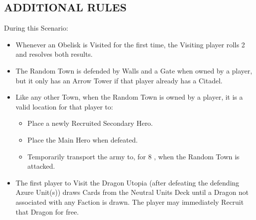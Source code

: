 \begin{multicols}{2}
\subsection*{\MakeUppercase{Additional Rules}}
During this Scenario:
\begin{itemize}
  \item Whenever an Obelisk is Visited for the first time, the Visiting player rolls 2  and resolves both results.
  \item The Random Town is defended by Walls and a Gate when owned by a player, but it only has an Arrow Tower if that player already has a Citadel.
  \item Like any other Town, when the Random Town is owned by a player, it is a valid location for that player to:
    \begin{itemize}
      \item Place a newly Recruited Secondary Hero.
      \item Place the Main Hero when defeated.
      \item Temporarily transport the army to, for 8 , when the Random Town is attacked.
    \end{itemize}
  \item The first player to Visit the Dragon Utopia (after defeating the defending Azure Unit(s)) draws Cards from the Neutral Units  Deck until a Dragon not associated with any Faction is drawn.
    The player may immediately Recruit that Dragon for free.
\end{itemize}

\columnbreak

\phantom{.}
\vfill
\begin{center}
\end{center}
\vfill
\phantom{.}
\end{multicols}


